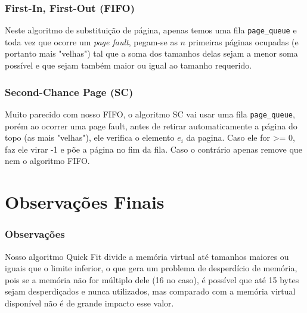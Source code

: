 \documentclass{beamer}
\begin{document}

\begin{frame}
  \frametitle{First-In, First-Out (FIFO)}
  Neste algoritmo de substituição de página, apenas temos uma fila \texttt{page\_queue} e toda vez
  que ocorre um \textit{page fault}, pegam-se as $n$ primeiras páginas ocupadas (e portanto mais
  "velhas") tal que a soma dos tamanhos delas sejam a menor soma possível e que sejam também maior
  ou igual ao tamanho requerido.
\end{frame}


\begin{frame}
\frametitle{Second-Chance Page (SC)}
Muito parecido com nosso FIFO, o algoritmo SC vai usar uma fila \texttt{page\_queue}, porém ao ocorrer uma page fault, antes de retirar automaticamente a página do topo (as mais "velhas"), ele verifica o elemento $e_i$ da pagina. Caso ele for >= 0, faz ele virar -1 e põe a página no fim da fila. Caso o contrário apenas remove que nem o algoritmo FIFO.
\end{frame}


\section{Observações Finais}



\begin{frame}
  \frametitle{Observações}
  Nosso algoritmo Quick Fit divide a memória virtual até tamanhos maiores ou iguais que o limite inferior, o que gera um problema de desperdício de memória, pois se a memória não for múltiplo dele (16 no caso),
  é possível que até 15 bytes sejam desperdiçados e nunca utilizados, mas comparado com a memória virtual disponível não é de grande impacto esse valor.
\end{frame}

\end{document}
